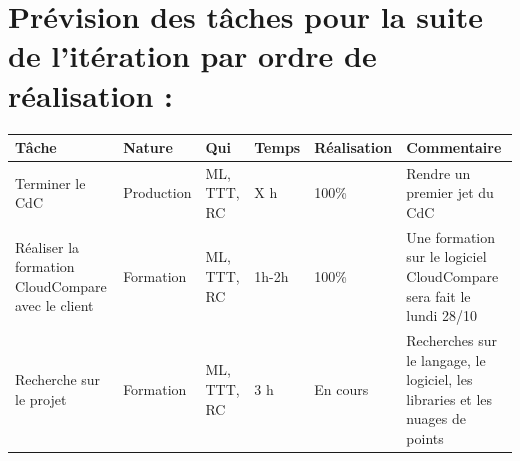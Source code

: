 \documentclass[12pt,titlepage,french]{article}
\begin{document}
\section{Prévision des tâches pour la suite de l'itération par ordre de réalisation :}

\noindent\begin{tabularx}{17cm}{|p{2.5cm}|p{2.5cm}|p{1cm}|p{1.5cm}|p{2.5cm}|X|}
    \hline
    \textbf{Tâche} & \textbf{Nature} & \textbf{Qui} & \textbf{Temps} & \textbf{Réalisation} & \textbf{Commentaire} \\
    \hline
    Terminer le CdC & Production & ML, TTT, RC & X h & 100\% & Rendre un premier jet du CdC \\
    \hline
    Réaliser la formation CloudCompare avec le client & Formation & ML, TTT, RC & 1h-2h & 100\% & Une formation sur le logiciel CloudCompare sera fait le lundi 28/10 \\
    \hline
    Recherche sur le projet & Formation & ML, TTT, RC & 3 h & En cours & Recherches sur le langage, le logiciel, les libraries et les nuages de points \\
    \hline
\end{tabularx}
\end{document}
